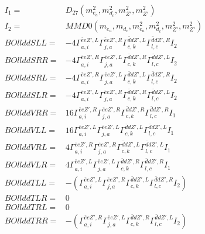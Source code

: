 \documentclass[A4,landscape]{article}
\begin{document}
\begin{align} 
I_1 = & D_{27}(m^2_{e_{{a}}}, m^2_{d_{{c}}}, m^2_{{Z'}}, m^2_{{Z'}}) \\ 
I_2 = & MMD0(m_{e_{{a}}}, m_{d_{{c}}}, m^2_{e_{{a}}}, m^2_{d_{{c}}}, m^2_{{Z'}}, m^2_{{Z'}}) \\ 
  BOllddSLL= & -4  \Gamma^{\bar{e}e {Z'} ,L}_{a, i} \Gamma^{\bar{e}e {Z'} ,R}_{j, a} \Gamma^{\bar{d}d {Z'} ,L}_{c, k} \Gamma^{\bar{d}d {Z'} ,R}_{l, c} I_2 \\ 
  BOllddSRR= & -4  \Gamma^{\bar{e}e {Z'} ,R}_{a, i} \Gamma^{\bar{e}e {Z'} ,L}_{j, a} \Gamma^{\bar{d}d {Z'} ,R}_{c, k} \Gamma^{\bar{d}d {Z'} ,L}_{l, c} I_2 \\ 
  BOllddSRL= & -4  \Gamma^{\bar{e}e {Z'} ,R}_{a, i} \Gamma^{\bar{e}e {Z'} ,L}_{j, a} \Gamma^{\bar{d}d {Z'} ,L}_{c, k} \Gamma^{\bar{d}d {Z'} ,R}_{l, c} I_2 \\ 
  BOllddSLR= & -4  \Gamma^{\bar{e}e {Z'} ,L}_{a, i} \Gamma^{\bar{e}e {Z'} ,R}_{j, a} \Gamma^{\bar{d}d {Z'} ,R}_{c, k} \Gamma^{\bar{d}d {Z'} ,L}_{l, c} I_2 \\ 
  BOllddVRR= & 16  \Gamma^{\bar{e}e {Z'} ,R}_{a, i} \Gamma^{\bar{e}e {Z'} ,R}_{j, a} \Gamma^{\bar{d}d {Z'} ,R}_{c, k} \Gamma^{\bar{d}d {Z'} ,R}_{l, c} I_1 \\ 
  BOllddVLL= & 16  \Gamma^{\bar{e}e {Z'} ,L}_{a, i} \Gamma^{\bar{e}e {Z'} ,L}_{j, a} \Gamma^{\bar{d}d {Z'} ,L}_{c, k} \Gamma^{\bar{d}d {Z'} ,L}_{l, c} I_1 \\ 
  BOllddVRL= & 4  \Gamma^{\bar{e}e {Z'} ,R}_{a, i} \Gamma^{\bar{e}e {Z'} ,R}_{j, a} \Gamma^{\bar{d}d {Z'} ,L}_{c, k} \Gamma^{\bar{d}d {Z'} ,L}_{l, c} I_1 \\ 
  BOllddVLR= & 4  \Gamma^{\bar{e}e {Z'} ,L}_{a, i} \Gamma^{\bar{e}e {Z'} ,L}_{j, a} \Gamma^{\bar{d}d {Z'} ,R}_{c, k} \Gamma^{\bar{d}d {Z'} ,R}_{l, c} I_1 \\ 
  BOllddTLL= & -( \Gamma^{\bar{e}e {Z'} ,L}_{a, i} \Gamma^{\bar{e}e {Z'} ,R}_{j, a} \Gamma^{\bar{d}d {Z'} ,L}_{c, k} \Gamma^{\bar{d}d {Z'} ,R}_{l, c} I_2) \\ 
  BOllddTLR= & 0 \\ 
  BOllddTRL= & 0 \\ 
  BOllddTRR= & -( \Gamma^{\bar{e}e {Z'} ,R}_{a, i} \Gamma^{\bar{e}e {Z'} ,L}_{j, a} \Gamma^{\bar{d}d {Z'} ,R}_{c, k} \Gamma^{\bar{d}d {Z'} ,L}_{l, c} I_2) \\ 
\end{align} 
\end{document}
